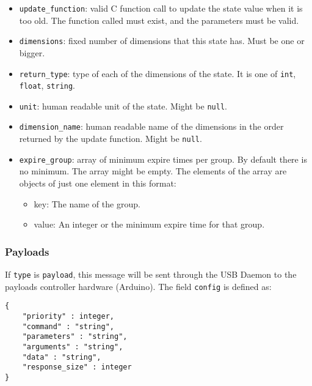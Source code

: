 \documentclass[12pt,a4paper]{report}
\begin{document}
\begin{itemize}
\item \texttt{update\_function}: valid C function call to update the state value when it is too old. The function called must exist, and the parameters must be valid.
\item \texttt{dimensions}: fixed number of dimensions that this state has. Must be one or bigger.
\item \texttt{return\_type}: type of each of the dimensions of the state. It is one of \texttt{int}, \texttt{float}, \texttt{string}.
\item \texttt{unit}: human readable unit of the state. Might be \texttt{null}.
\item \texttt{dimension\_name}: human readable name of the dimensions in the order returned by the update function. Might be \texttt{null}.
\item \texttt{expire\_group}: array of minimum expire times per group. By default there is no minimum. The array might be empty. The elements of the array are objects of just one element in this format:
\begin{itemize}
\item key: The name of the group.
\item value: An integer or the minimum expire time for that group.
\end{itemize}
\end{itemize}

\subsubsection*{Payloads}
If \texttt{type} is \texttt{payload}, this message will be sent through the USB Daemon to the payloads controller hardware (Arduino). The field \texttt{config} is defined as:
\begin{lstlisting}
{
	"priority" : integer,
	"command" : "string",
	"parameters" : "string",
	"arguments" : "string",
	"data" : "string",
	"response_size" : integer
}
\end{lstlisting}
\end{document}
